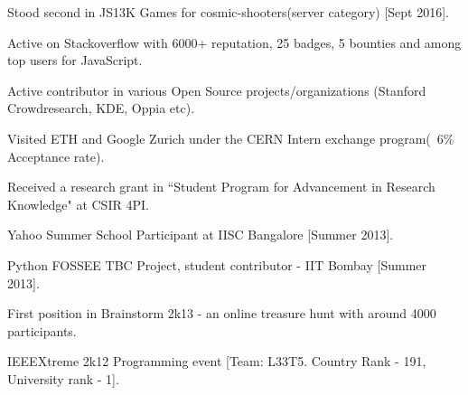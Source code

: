 

\begin{cventries}
    \cvactivities
    {
        \begin{cvitems} %
            \item {Stood second in JS13K Games for cosmic-shooters(server category) [Sept 2016].}
            \item {Active on Stackoverflow with 6000+ reputation, 25 badges, 5 bounties and among top users for JavaScript.}
            \item {Active contributor in various Open Source projects/organizations (Stanford Crowdresearch, KDE, Oppia etc).}
            \item {Visited ETH and Google Zurich under the CERN Intern exchange program(~6\% Acceptance rate).}
            \item {Received a research grant in ``Student Program for Advancement in Research Knowledge" at CSIR 4PI.}
            \item {Yahoo Summer School Participant at IISC Bangalore [Summer 2013].}
            \item {Python FOSSEE TBC Project, student contributor - IIT Bombay [Summer 2013].}
            \item {First position in Brainstorm 2k13 - an online treasure hunt with around 4000 participants.}
            \item {IEEEXtreme 2k12 Programming event [Team: L33T5. Country Rank - 191, University rank - 1].}
        \end{cvitems}
    }
\end{cventries}
